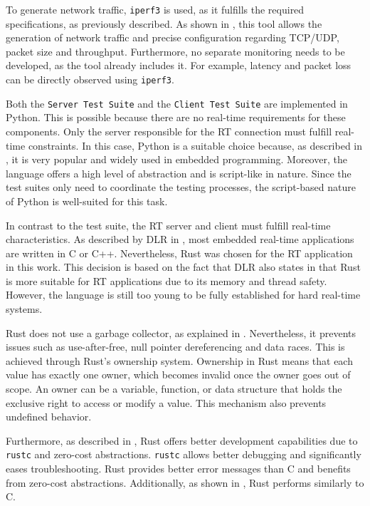 To generate network traffic, \texttt{iperf3} is used, as it fulfills the required specifications, as previously described.  
As shown in \cite{iperf}, this tool allows the generation of network traffic and precise configuration regarding TCP/UDP, packet size and throughput.  
Furthermore, no separate monitoring needs to be developed, as the tool already includes it.  
For example, latency and packet loss can be directly observed using \texttt{iperf3}.  

Both the \texttt{Server Test Suite} and the \texttt{Client Test Suite} are implemented in Python.  
This is possible because there are no real-time requirements for these components.  
Only the server responsible for the RT connection must fulfill real-time constraints.  
In this case, Python is a suitable choice because, as described in \cite{10209340}, it is very popular and widely used in embedded programming.  
Moreover, the language offers a high level of abstraction and is script-like in nature.  
Since the test suites only need to coordinate the testing processes, the script-based nature of Python is well-suited for this task.  

In contrast to the test suite, the RT server and client must fulfill real-time characteristics.  
As described by DLR in \cite[p. 86]{dlr212971}, most embedded real-time applications are written in C or C++.  
Nevertheless, Rust was chosen for the RT application in this work.  
This decision is based on the fact that DLR also states in \cite{dlr212971} that Rust is more suitable for RT applications due to its memory and thread safety.  
However, the language is still too young to be fully established for hard real-time systems.  

Rust does not use a garbage collector, as explained in \cite[p. 2]{10.5555/3563572.3563603}.  
Nevertheless, it prevents issues such as use-after-free, null pointer dereferencing and data races.  
This is achieved through Rust's ownership system.  
Ownership in Rust means that each value has exactly one owner, which becomes invalid once the owner goes out of scope.  
An owner can be a variable, function, or data structure that holds the exclusive right to access or modify a value.  
This mechanism also prevents undefined behavior.  

Furthermore, as described in \cite[p. 1]{10.5555/3563572.3563603}, Rust offers better development capabilities due to \texttt{rustc} and zero-cost abstractions.  
\texttt{rustc} allows better debugging and significantly eases troubleshooting.  
Rust provides better error messages than C and benefits from zero-cost abstractions.  
Additionally, as shown in \cite[p. 1]{10321761}, Rust performs similarly to C.  

